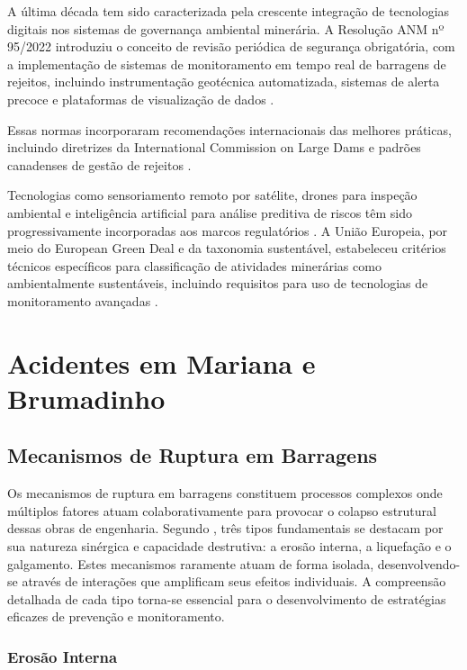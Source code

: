 A última década tem sido caracterizada pela crescente integração de tecnologias digitais nos sistemas de governança ambiental minerária. A Resolução ANM nº 95/2022 introduziu o conceito de revisão periódica de segurança obrigatória, com a implementação de sistemas de monitoramento em tempo real de barragens de rejeitos, incluindo instrumentação geotécnica automatizada, sistemas de alerta precoce e plataformas de visualização de dados \cite{anm2022resolucao95}.

Essas normas incorporaram recomendações internacionais das melhores práticas, incluindo diretrizes da International Commission on Large Dams \cite{icold2022tailings} e padrões canadenses de gestão de rejeitos \cite{mac2021guide}.

Tecnologias como sensoriamento remoto por satélite, drones para inspeção ambiental e inteligência artificial para análise preditiva de riscos têm sido progressivamente incorporadas aos marcos regulatórios \cite{darzi2024transformacao}. A União Europeia, por meio do European Green Deal e da taxonomia sustentável, estabeleceu critérios técnicos específicos para classificação de atividades minerárias como ambientalmente sustentáveis, incluindo requisitos para uso de tecnologias de monitoramento avançadas \cite{eu2020taxonomy}.

\section{Acidentes em Mariana e Brumadinho}
\label{sec:acidentes}

\subsection{Mecanismos de Ruptura em Barragens}

Os mecanismos de ruptura em barragens constituem processos complexos onde múltiplos fatores atuam colaborativamente para provocar o colapso estrutural dessas obras de engenharia. Segundo , três tipos fundamentais se destacam por sua natureza sinérgica e capacidade destrutiva: a erosão interna, a liquefação e o galgamento. Estes mecanismos raramente atuam de forma isolada, desenvolvendo-se através de interações que amplificam seus efeitos individuais. A compreensão detalhada de cada tipo torna-se essencial para o desenvolvimento de estratégias eficazes de prevenção e monitoramento.

\subsubsection{Erosão Interna}

